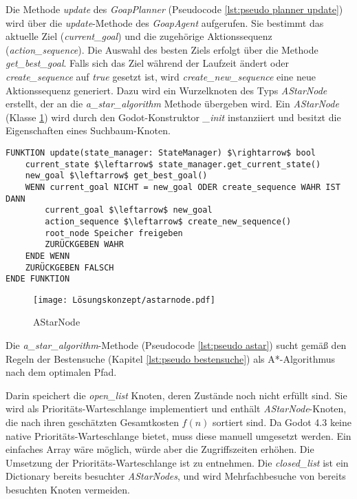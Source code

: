 Die Methode \textit{update} des \textit{GoapPlanner} (Pseudocode \ref{lst:pseudo planner update}) wird über die \textit{update}-Methode des \textit{GoapAgent} aufgerufen. Sie bestimmt das aktuelle Ziel (\textit{current\_goal}) und die zugehörige Aktionssequenz (\textit{action\_sequence}). Die Auswahl des besten Ziels erfolgt über die Methode \textit{get\_best\_goal}. Falls sich das Ziel während der Laufzeit ändert oder \textit{create\_sequence} auf \textit{true} gesetzt ist, wird \textit{create\_new\_sequence} eine neue Aktionssequenz generiert. Dazu wird ein Wurzelknoten des Typs \textit{AStarNode} erstellt, der an die \textit{a\_star\_algorithm} Methode übergeben wird. Ein \textit{AStarNode} (Klasse \ref{fig:AStarNode}) wird durch den Godot-Konstruktor \textit{\_init} instanziiert und besitzt die Eigenschaften eines Suchbaum-Knoten.

\begin{lstlisting}[language=Pseudo, caption={update Methode des GoapAgent}, mathescape=true, label={lst:pseudo planner update}]
FUNKTION update(state_manager: StateManager) $\rightarrow$ bool
    current_state $\leftarrow$ state_manager.get_current_state()
    new_goal $\leftarrow$ get_best_goal()
    WENN current_goal NICHT = new_goal ODER create_sequence WAHR IST DANN
        current_goal $\leftarrow$ new_goal
        action_sequence $\leftarrow$ create_new_sequence()
        root_node Speicher freigeben
        ZURÜCKGEBEN WAHR
    ENDE WENN
    ZURÜCKGEBEN FALSCH
ENDE FUNKTION
\end{lstlisting}

\begin{figure}[h]
  \centering
  \texttt{[image: Lösungskonzept/astarnode.pdf]}
	\captionsetup{justification=justified, format=plain}
  \caption{AStarNode}
  \label{fig:AStarNode}
\end{figure}

Die \textit{a\_star\_algorithm}-Methode (Pseudocode \ref{lst:pseudo astar}) sucht gemäß den Regeln der Bestensuche (Kapitel \ref{lst:pseudo bestensuche}) als A*-Algorithmus nach dem optimalen Pfad.

Darin speichert die \textit{open\_list} Knoten, deren Zustände noch nicht erfüllt sind. Sie wird als Prioritäts-Warteschlange implementiert und enthält \textit{AStarNode}-Knoten, die nach ihren geschätzten Gesamtkosten $f(n)$ sortiert sind. Da Godot 4.3 keine native Prioritäts-Warteschlange bietet, muss diese manuell umgesetzt werden. Ein einfaches Array wäre möglich, würde aber die Zugriffszeiten erhöhen. Die Umsetzung der Prioritäts-Warteschlange ist \autocite{oleg} zu entnehmen. Die \textit{closed\_list} ist ein Dictionary bereits besuchter \textit{AStarNodes}, und wird Mehrfachbesuche von bereits besuchten Knoten vermeiden. 

